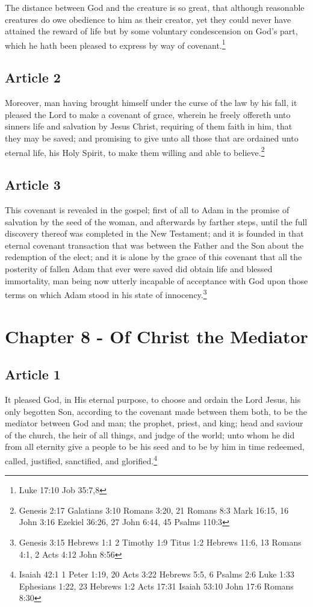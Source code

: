 \documentclass[12pt,letterpaper]{book}
\begin{document}
The distance between God and the creature is so great, that although reasonable creatures do owe obedience to him as their creator, yet they could never have attained the reward of life but by some voluntary condescension on God's part, which he hath been pleased to express by way of covenant.\footnote{Luke 17:10 Job 35:7,8}

\section{Article 2}

Moreover, man having brought himself under the curse of the law by his fall, it pleased the Lord to make a covenant of grace, wherein he freely offereth unto sinners life and salvation by Jesus Christ, requiring of them faith in him, that they may be saved; and promising to give unto all those that are ordained unto eternal life, his Holy Spirit, to make them willing and able to believe.\footnote{Genesis 2:17 Galatians 3:10 Romans 3:20, 21 Romans 8:3 Mark 16:15, 16 John 3:16 Ezekiel 36:26, 27 John 6:44, 45 Psalms 110:3}

\section{Article 3}

This covenant is revealed in the gospel; first of all to Adam in the promise of salvation by the seed of the woman, and afterwards by farther steps, until the full discovery thereof was completed in the New Testament; and it is founded in that eternal covenant transaction that was between the Father and the Son about the redemption of the elect; and it is alone by the grace of this covenant that all the posterity of fallen Adam that ever were saved did obtain life and blessed immortality, man being now utterly incapable of acceptance with God upon those terms on which Adam stood in his state of innocency.\footnote{Genesis 3:15 Hebrews 1:1 2 Timothy 1:9 Titus 1:2 Hebrews 11:6, 13 Romans 4:1, 2 Acts 4:12 John 8:56}

\chapter{Chapter 8 - Of Christ the Mediator}
\section{Article 1}

It pleased God, in His eternal purpose, to choose and ordain the Lord Jesus, his only begotten Son, according to the covenant made between them both, to be the mediator between God and man; the prophet, priest, and king; head and saviour of the church, the heir of all things, and judge of the world; unto whom he did from all eternity give a people to be his seed and to be by him in time redeemed, called, justified, sanctified, and glorified.\footnote{Isaiah 42:1 1 Peter 1:19, 20 Acts 3:22 Hebrews 5:5, 6 Psalms 2:6 Luke 1:33 Ephesians 1:22, 23 Hebrews 1:2 Acts 17:31 Isaiah 53:10 John 17:6 Romans 8:30}
\end{document}
